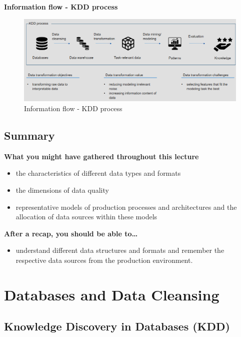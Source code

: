 \documentclass[12pt, a4paper, oneside, justified]{article}
\begin{document}
\textbf{Information flow - KDD process}

\begin{figure}[htbp]
    \centering
    \includegraphics[scale=0.8]{../img/2-5.png}
    \caption{Information flow - KDD process}
    \label{img/2-5}
\end{figure}

\subsection{Summary}

\textbf{What you might have gathered throughout this lecture}

\begin{itemize}
    \item the characteristics of different data types and formats
    \item the dimensions of data quality
    \item representative models of production processes and architectures
    and the allocation of data sources within these models
\end{itemize}

\textbf{After a recap, you should be able to…}
\begin{itemize}
    \item understand different data structures and formats and
    remember the respective data sources from the
    production environment.
\end{itemize}

\newpage

\section{Databases and Data Cleansing}

\subsection{Knowledge Discovery in Databases (KDD)}
\end{document}
